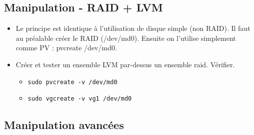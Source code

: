 \documentclass[a4paper]{article}
\begin{document}
\subsection{Manipulation - RAID + LVM}





\begin{itemize}

\item Le principe est identique à l’utilisation de disque simple (non RAID). Il faut au préalable créer le RAID (/dev/md0). Ensuite on l’utilise simplement comme PV : pvcreate /dev/md0.

\item Créer et tester un ensemble LVM par-dessus un ensemble raid. Vérifier.
\begin{example}
    \begin{itemize}
        \item \texttt{sudo pvcreate -v /dev/md0}
        \item \texttt{sudo vgcreate -v vg1 /dev/md0}
    \end{itemize}
\end{example}

\end{itemize}










\subsection{Manipulation avancées}
\end{document}
